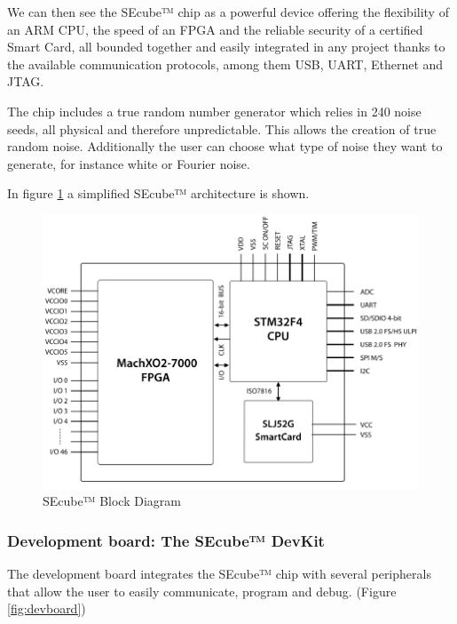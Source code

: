 We can then see the SEcube™ chip as a powerful device offering the flexibility of an \textsc{ARM} CPU, the speed of an FPGA and the reliable security of a certified Smart Card, all bounded together and easily integrated in any project thanks to the available communication protocols, among them USB, UART, Ethernet and JTAG. 

The chip includes a true random number generator which relies in 240 noise seeds, all physical and therefore unpredictable. This allows the creation of true random noise. Additionally the user can choose what type of noise they want to generate, for instance white or Fourier noise.


In figure \ref{fig:SEcubeBD} a simplified SEcube™ architecture is shown.

\begin{figure}[ht]
	\centering
	\includegraphics[width=\textwidth]{chapters/figures/development/SEcubeBlocks.png}
	\caption{SEcube™ Block Diagram}
	\label{fig:SEcubeBD}
\end{figure}


\subsubsection{Development board: The SEcube™ DevKit}

The development board integrates the SEcube™ chip with several peripherals that allow the user to easily communicate, program and debug. (Figure \ref{fig:devboard})

